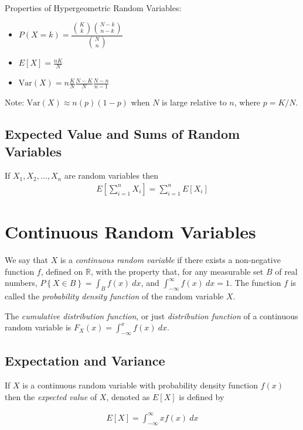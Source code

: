 \documentclass[10pt]{article}
\begin{document}
			Properties of Hypergeometric Random Variables:
		\begin{multicols}{3}
			\begin{itemize}
				\item $P(X=k) = \dfrac{{K \choose k} {{N-k} \choose {n-k}}}{{N \choose n}}$
				\item $E[X] = \frac{nK}{N}$
				\item $\text{Var}(X)= n \frac{K}{N} \frac{N-K}{N} \frac{N-n}{n-1}$
			\end{itemize}
		\end{multicols}
		Note: $\text{Var}(X) \approx n(p)(1-p)$ when $N$ is large relative to $n$, where $p=K/N$.
		
		\subsection*{Expected Value and Sums of Random Variables}
		If $X_1, X_2, \ldots, X_n$ are random variables then
		\begin{align*}
			E \left[ \sum_{i=1}^{n} X_i \right] = \sum_{i=1}^{n} E[X_i]
		\end{align*}
		
		\newpage
		
		\section{Continuous Random Variables}
		We say that $X$ is a \emph{continuous random variable} if there exists a non-negative function $f$, defined on $\mathbb{R}$, with the property that, for any measurable set $B$ of real numbers, $P\left\{ X \in B \right\} = \int_{B} f(x)\: dx$, and $\int_{-\infty}^{\infty}f(x)\:dx = 1$. The function $f$ is called the \emph{probability density function} of the random variable $X$.
		
		The \emph{cumulative distribution function}, or just \emph{distribution function} of a continuous random variable is $F_X(x) = \int_{-\infty}^{x}f(x)\: dx$.
		
		\subsection*{Expectation and Variance}
		If $X$ is a continuous random variable with probability density function $f(x)$ then the \emph{expected value} of $X$, denoted as $E[X]$ is defined by
		
		\begin{align*}
			E[X] = \int_{-\infty}^{\infty} xf(x)\:dx
		\end{align*}
		
\end{document}
